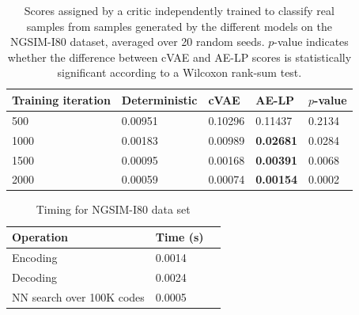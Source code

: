\documentclass{article}
\begin{document}
\begin{table}
  \caption{Scores assigned by a critic independently trained to classify real samples from samples generated by the different models on the NGSIM-I80 dataset, averaged over 20 random seeds. $p$-value indicates whether the difference between cVAE and AE-LP scores is statistically significant according to a Wilcoxon rank-sum test.}
  \label{sample-table}
  \centering
  \begin{tabular}{l|l|lll}
    \toprule
    Training iteration     & Deterministic & cVAE & AE-LP & $p$-value \\
    \midrule
    500 & 0.00951 & 0.10296 & 0.11437 & 0.2134 \\
    1000 & 0.00183 & 0.00989 & \textbf{0.02681} & 0.0284 \\
    1500 & 0.00095 & 0.00168 & \textbf{0.00391} & 0.0068 \\
    2000 & 0.00059 & 0.00074 & \textbf{0.00154} & 0.0002 \\
    \bottomrule
  \end{tabular}
\end{table}


\begin{table}
  \caption{Timing for NGSIM-I80 data set}
  \label{sample-table}
  \centering
  \begin{tabular}{lll}
    \toprule
    Operation     & Time (s) \\
    \midrule
    Encoding & 0.0014  \\
    Decoding     & 0.0024 \\
    NN search over 100K codes & 0.0005      \\
    \bottomrule
  \end{tabular}
\end{table}



%
%
%
%
%
%
\end{document}
